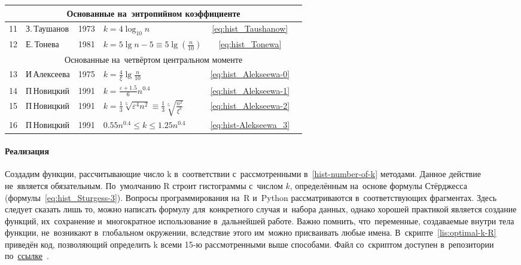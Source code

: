 \documentclass[]{scrartcl}
\begin{document}
\begin{table}[ht]
\begin{tabularx}{\textwidth}{lXcXcc}
		\\ \hline
		\multicolumn{6}{c}{Основанные на~энтропийном коэффициенте}
		\\ \hline
		11 & З.\,Таушанов & 1973 & $k = 4 \log_{10}{n}$ & \ref{eq:hist_Taushanow} & \cite{Taushanow-k-hist}
		\\ \hline
		12 & Е.\,Тонева & 1981 & $k = 5 \lg n - 5 \equiv 5 \lg (\frac{n}{10})$ & \ref{eq:hist_Tonewa} & \cite{Tonewa:k-hist}
		\\ \hline
		\multicolumn{6}{c}{Основанные на~четвёртом центральном моменте}
		\\ \hline
		13 & И\,Алексеева & 1975 & $k = \frac{4}{\xi}\lg\frac{n}{10}$ & \ref{eq:hist_Alekseewa-0} &\cite{Alekseewa:k-hist}
		\\ \hline
		14 & П\,Новицкий & 1991 & $k = \frac{\varepsilon+1.5}{6} n^{0.4}$ & \ref{eq:hist_Alekseewa-1} & \cite{Nowiczkij:oczenka-pogresh}
		\\ \hline
		15 & П\,Новицкий & 1991 & $k = \frac{1}{3}\sqrt[5]{\varepsilon^4 n^2} \equiv \frac{1}{3} \sqrt[5]{\frac{n^2}{\xi^8}}$ & \ref{eq:hist_Alekseewa-2} & \cite{Nowiczkij:oczenka-pogresh}
		\\ \hline
		16 & П\,Новицкий & 1991 & $0.55n^{0.4} \leq k \leq 1.25n^{0.4}$ & \ref{eq:hist-Alekseewa_3} & \cite{Nowiczkij:oczenka-pogresh}
		\\ \hline
		\end{tabularx}
\end{table}

\paragraph{Реализация}
\par
Создадим функции, рассчитывающие число k в~соответствии с~рассмотренными в~\ref{hist-number-of-k} методами. Данное действие не~является обязательным. По~умолчанию R строит гистограммы с~числом $k$, определённым на~основе формулы Стёрджесса (формулы~\ref{eq:hist_Sturgess-3}). Вопросы программирования на~R и~Python рассматриваются в~соответствующих фрагментах. Здесь следует сказать лишь то, можно написать формулу для~конкретного случая и~набора данных, однако хорошей практикой является создание функций, их~сохранение и~многократное использование в~дальнейшей работе. Важно помнить, что~переменные, создаваемые внутри тела функции, не~возникают в~глобальном окружении, вследствие этого им~можно присваивать любые имена. В~скрипте~\ref{lis:optimal-k-R} приведён код, позволяющий определить k всеми 15-ю рассмотренными выше способами. Файл со~скриптом доступен в~репозитории по~\href{https://github.com/Kirill-Murashev/AI_for_valuers_R_source/tree/main/Hist}{ссылке}~\cite{R_source_github}.
\end{document}
